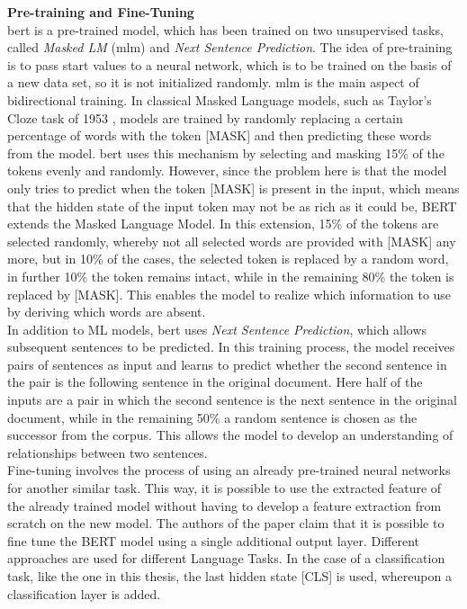 \documentclass[a4paper, 11pt,titlepage,oneside,openany]{book}
\begin{document}
\noindent \textbf{Pre-training and Fine-Tuning}\\
\indent \gls{bert} is a pre-trained model, which has been trained on two unsupervised tasks, called \textit{Masked LM} (\gls{mlm}) and \textit{Next Sentence Prediction}. The idea of pre-training is to pass start values to a neural network, which is to be trained on the basis of a new data set, so it is not initialized randomly.
\newpage
\noindent \gls{mlm} is the main aspect of bidirectional training. In classical Masked Language models, such as Taylor's Cloze task of 1953 \cite{cloze}, models are trained by randomly replacing a certain percentage of words with the token [MASK] and then predicting these words from the model. \gls{bert} uses this mechanism by selecting and masking 15\% of the tokens evenly and randomly. However, since the problem here is that the model only tries to predict when the token [MASK] is present in the input, which means that the hidden state of the input token may not be as rich as it could be, BERT extends the Masked Language Model. In this extension, 15\% of the tokens are selected randomly, whereby not all selected words are provided with [MASK] any more, but in 10\% of the cases, the selected token is replaced by a random word, in further 10\% the token remains intact, while in the remaining 80\% the token is replaced by [MASK]. This enables the model to realize which information to use by deriving which words are absent.\\
\noindent In addition to ML models, \gls{bert} uses \textit{Next Sentence Prediction}, which allows subsequent sentences to be predicted. In this training process, the model receives pairs of sentences as input and learns to predict whether the second sentence in the pair is the following sentence in the original document. Here half of the inputs are a pair in which the second sentence is the next sentence in the original document, while in the remaining 50\% a random sentence is chosen as the successor from the corpus. This allows the model to develop an understanding of relationships between two sentences. \\

Fine-tuning involves the process of using an already pre-trained neural networks for another similar task. This way, it is possible to use the extracted feature of the already trained model without having to develop a feature extraction from scratch on the new model. The authors of the paper claim that it is possible to fine tune the BERT model using a single additional output layer. Different approaches are used for different Language Tasks. In the case of a classification task, like the one in this thesis, the last hidden state [CLS] is used, whereupon a classification layer is added. 
\end{document}
